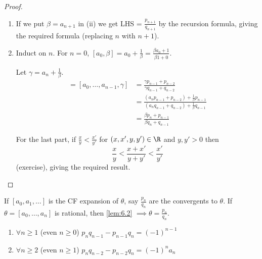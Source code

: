 \documentclass{article}
\begin{document}
\begin{proof}
    \leavevmode
    \begin{enumerate}[label=(\roman*)]
        \item If we put $\beta = a_{n+1}$ in (ii) we get LHS = $\frac{p_{n+1}}{q_{n+1}}$ by the recursion formula, giving the required formula (replacing $n$ with $n+1$).
        \item Induct on $n$. For $n=0$, $[a_0, \beta] = a_0 + \frac{1}{\beta} = \frac{\beta a_0 + 1}{\beta \dot 1 + 0}$.

            Let $\gamma = a_n + \frac{1}{\beta}$.
            \begin{align*}
                [a_0, \dotsc, a_n, \beta] = [a_0, \dotsc, a_{n-1}, \gamma] &= \frac{\gamma p_{n-1} + p_{n-2}}{\gamma q_{n-1} + q_{n-2}} \\
                                                                           &= \frac{(a_n p_{n-1} + p_{n-2}) + \frac{1}{\beta} p_{n-1}}{(a_n q_{n-1} + q_{n-2}) + \frac{1}{\beta} q_{n-1}} \\
                                                                           &= \frac{\beta p_n + p_{n-1}} {\beta q_n + q_{n-1}}
            \end{align*}

            For the last part, if $\frac{x}{y} < \frac{x'}{y'}$ for $(x, x', y, y') \in \R$ and $y, y' > 0$ then
            \begin{equation*}
                \frac{x}{y} < \frac{x+x'}{y+y'} < \frac{x'}{y'}
            \end{equation*}
            (exercise), giving the required result.
    \end{enumerate}
\end{proof}

If $[a_0, a_1, \dotsc]$ is the CF expansion of $\theta$, say $\frac{p_n}{q_n}$ are the convergents to $\theta$. If $\theta = [a_0, \dotsc, a_n]$ is rational, then \cref{lem:6.2} $\implies \theta = \frac{p_n}{q_n}$.

\begin{nlemma}\label{lem:6.3}
    \leavevmode
    \begin{enumerate}[label=(\roman*)]
        \item $\forall n \geq 1$ (even $n \geq 0$) $p_n q_{n-1} - p_{n-1} q_n = (-1)^{n-1}$
        \item $\forall n \geq 2$ (even $n \geq 1$) $p_n q_{n-2} - p_{n-2} q_n = (-1)^n a_n$
    \end{enumerate}
\end{nlemma}
\end{document}
